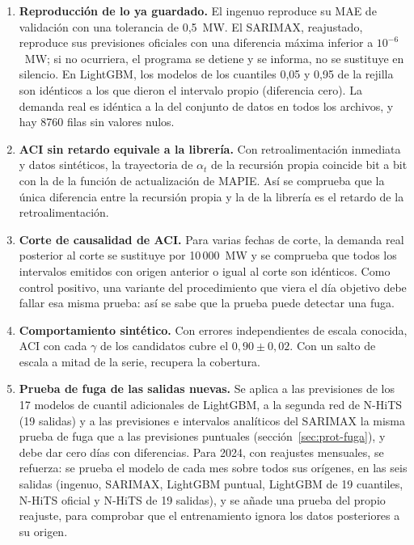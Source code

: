 \begin{enumerate}
	\item \textbf{Reproducción de lo ya guardado.} El ingenuo reproduce su MAE
	de validación con una tolerancia de 0,5~MW. El SARIMAX, reajustado,
	reproduce sus previsiones oficiales con una diferencia máxima inferior a
	$10^{-6}$~MW; si no ocurriera, el programa se detiene y se informa, no se
	sustituye en silencio. En LightGBM, los modelos de los cuantiles 0,05 y
	0,95 de la rejilla son idénticos a los que dieron el intervalo propio
	(diferencia cero). La demanda real es idéntica a la del conjunto de datos
	en todos los archivos, y hay 8760 filas sin valores nulos.
	\item \textbf{ACI sin retardo equivale a la librería.} Con retroalimentación
	inmediata y datos sintéticos, la trayectoria de $\alpha_t$ de la recursión
	propia coincide bit a bit con la de la función de actualización de MAPIE.
	Así se comprueba que la única diferencia entre la recursión propia y la de
	la librería es el retardo de la retroalimentación.
	\item \textbf{Corte de causalidad de ACI.} Para varias fechas de corte, la
	demanda real posterior al corte se sustituye por 10\,000~MW y se comprueba
	que todos los intervalos emitidos con origen anterior o igual al corte son
	idénticos. Como control positivo, una variante del procedimiento que viera
	el día objetivo debe fallar esa misma prueba: así se sabe que la prueba
	puede detectar una fuga.
	\item \textbf{Comportamiento sintético.} Con errores independientes de
	escala conocida, ACI con cada $\gamma$ de los candidatos cubre el
	$0{,}90 \pm 0{,}02$. Con un salto de escala a mitad de la serie, recupera la
	cobertura.
	\item \textbf{Prueba de fuga de las salidas nuevas.} Se aplica a las
	previsiones de los 17 modelos de cuantil adicionales de LightGBM, a la
	segunda red de N-HiTS (19 salidas) y a las previsiones e intervalos
	analíticos del SARIMAX la misma prueba de fuga que a las previsiones
	puntuales (sección~\ref{sec:prot-fuga}), y debe dar cero días con
	diferencias. Para 2024, con reajustes mensuales, se refuerza: se prueba el
	modelo de cada mes sobre todos sus orígenes, en las seis salidas (ingenuo,
	SARIMAX, LightGBM puntual, LightGBM de 19 cuantiles, N-HiTS oficial y N-HiTS de
	19 salidas), y se añade una prueba del propio reajuste, para comprobar que
	el entrenamiento ignora los datos posteriores a su origen.
\end{enumerate}


